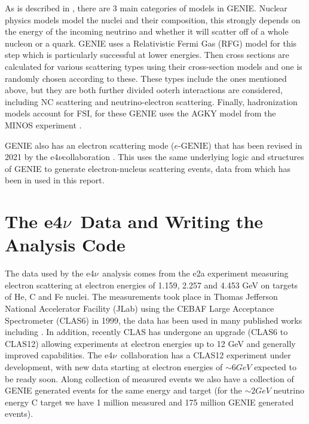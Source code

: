 \documentclass[a4paper,12pt]{article}
\newcommand{\efn}{e4$\nu$}
\newcommand{\eGEN}{$e\text{-GENIE}$}
\begin{document}
As is described in \cite{andreopoulosGENIENeutrinoMonte2010}, there are 3 main categories of models in GENIE.
Nuclear physics models model the nuclei and their composition, this strongly depends on the energy of the incoming neutrino and whether it will scatter off of a whole nucleon or a quark.
GENIE uses a Relativistic Fermi Gas (RFG) model for this step which is particularly successful at lower energies.
Then cross sections are calculated for various scattering types using their cross-section models and one is randomly chosen according to these.
These types include the ones mentioned above, but they are both further divided ooterh interactions are considered, including NC scattering and neutrino-electron scattering.
Finally, hadronization models account for FSI, for these GENIE uses the AGKY model from the MINOS experiment \cite{HadronizationModelMINOS}.

GENIE also has an electron scattering mode (\eGEN) that has been revised in 2021 by the \efn collaboration \cite{e4ncollaborationInclusiveElectronScattering2021}.
This uses the same underlying logic and structures of GENIE to generate electron-nucleus scattering events, data from which has been in used in this report.

\section{The \efn\ Data and Writing the Analysis Code}
The data used by the \efn\ analysis comes from the e2a experiment measuring electron scattering at electron energies of 1.159, 2.257 and 4.453 \si{GeV} on targets of He, C and Fe nuclei.
The measurements took place in Thomas Jefferson National Accelerator Facility (JLab) using the CEBAF Large Acceptance Spectrometer (CLAS6) \cite{meckingCEBAFLargeAcceptance2003} in 1999, the data has been used in many published works including \cite{khachatryanElectronbeamEnergyReconstruction2021}.
In addition, recently CLAS has undergone an upgrade (CLAS6 to CLAS12) \cite{burkertCLAS12SpectrometerJefferson2020} allowing experiments at electron energies up to 12 \si{GeV} and generally improved capabilities.
The \efn\ collaboration has a CLAS12 experiment under development, with new data starting at electron energies of $\sim6 \si{GeV}$ expected to be ready soon.
Along collection of measured events we also have a collection of GENIE generated events for the same energy and target (for the $\sim 2\si{GeV}$ neutrino energy C target we have 1 million measured and 175 million GENIE generated events).
\end{document}
